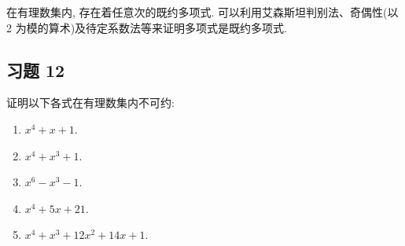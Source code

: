 \begin{note}
	在有理数集内, 存在着任意次的既约多项式. 可以利用艾森斯坦判别法、奇偶性(以 2 为模的算术)及待定系数法等来证明多项式是既约多项式.
\end{note}

\subsection*{习题 12}
证明以下各式在有理数集内不可约:
\begin{enumerate}
	\item 	$x^{4}+x+1$.
	\item 	$x^{4}+x^{3}+1$.
	\item 	$x^{6}-x^{3}-1$.
	\item 	$x^{4}+5 x+21$.
	\item 	$x^{4}+x^{3}+12 x^{2}+14 x+1$.
\end{enumerate}
